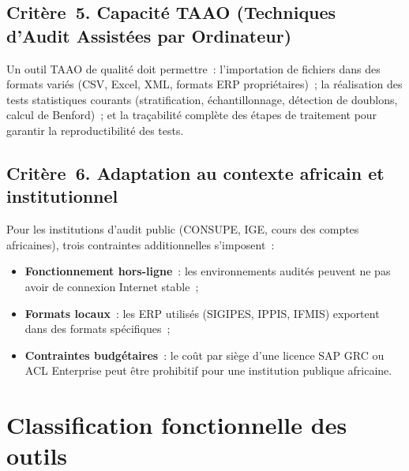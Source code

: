 \subsection*{Critère~5. Capacité TAAO (Techniques d'Audit Assistées par
Ordinateur)}

Un outil TAAO de qualité doit permettre~: l'importation de fichiers dans
des formats variés (CSV, Excel, XML, formats ERP propriétaires)~; la
réalisation des tests statistiques courants (stratification, échantillonnage,
détection de doublons, calcul de Benford)~; et la traçabilité complète
des étapes de traitement pour garantir la reproductibilité des tests.

\subsection*{Critère~6. Adaptation au contexte africain et institutionnel}

Pour les institutions d'audit public (CONSUPE, IGE, cours des comptes
africaines), trois contraintes additionnelles s'imposent~:
\begin{itemize}
  \item \textbf{Fonctionnement hors-ligne}~: les environnements audités
        peuvent ne pas avoir de connexion Internet stable~;
  \item \textbf{Formats locaux}~: les ERP utilisés (SIGIPES, IPPIS, IFMIS)
        exportent dans des formats spécifiques~;
  \item \textbf{Contraintes budgétaires}~: le coût par siège d'une licence
        SAP GRC ou ACL Enterprise peut être prohibitif pour une institution
        publique africaine.
\end{itemize}

\section{Classification fonctionnelle des outils}
\label{sec:classification-outils}

